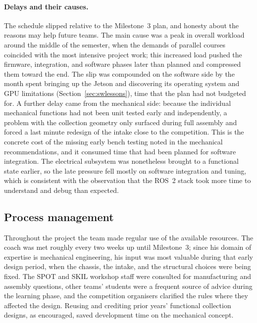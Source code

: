 \documentclass[11pt]{article}
\begin{document}
\paragraph{Delays and their causes.} The schedule slipped relative to the Milestone~3 plan, and honesty about the reasons may help future teams. The main cause was a peak in overall workload around the middle of the semester, when the demands of parallel courses coincided with the most intensive project work; this increased load pushed the firmware, integration, and software phases later than planned and compressed them toward the end. The slip was compounded on the software side by the month spent bringing up the Jetson and discovering its operating system and GPU limitations (Section~\ref{sec:swlessons}), time that the plan had not budgeted for. A further delay came from the mechanical side: because the individual mechanical functions had not been unit tested early and independently, a problem with the collection geometry only surfaced during full assembly and forced a last minute redesign of the intake close to the competition. This is the concrete cost of the missing early bench testing noted in the mechanical recommendations, and it consumed time that had been planned for software integration. The electrical subsystem was nonetheless brought to a functional state earlier, so the late pressure fell mostly on software integration and tuning, which is consistent with the observation that the ROS~2 stack took more time to understand and debug than expected.

\subsection{Process management}
Throughout the project the team made regular use of the available resources. The coach was met roughly every two weeks up until Milestone~3; since his domain of expertise is mechanical engineering, his input was most valuable during that early design period, when the chassis, the intake, and the structural choices were being fixed. The SPOT and SKIL workshop staff were consulted for manufacturing and assembly questions, other teams' students were a frequent source of advice during the learning phase, and the competition organisers clarified the rules where they affected the design. Reusing and crediting prior years' functional collection designs, as encouraged, saved development time on the mechanical concept.

\end{document}
